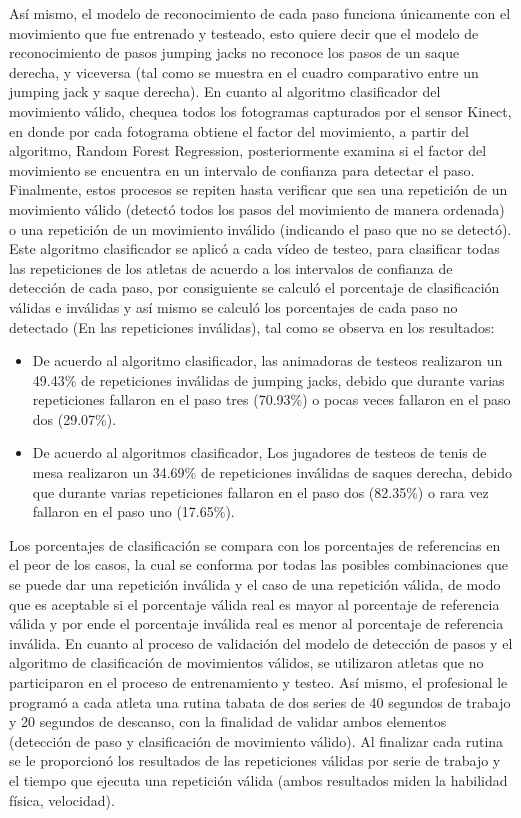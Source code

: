 \medbreak
As\'i mismo, el modelo de reconocimiento de cada paso funciona \'unicamente con el movimiento que fue entrenado y testeado, esto quiere decir que el modelo de reconocimiento de pasos jumping jacks no reconoce los pasos de un saque derecha, y viceversa (tal como se muestra en el cuadro comparativo entre un jumping jack  y saque derecha).
\medbreak
En cuanto al algoritmo clasificador del movimiento v\'alido, chequea todos los fotogramas capturados por el sensor Kinect, en donde por cada fotograma obtiene el factor del movimiento, a partir del algoritmo, Random Forest Regression, posteriormente examina si el factor del movimiento se encuentra en un intervalo de confianza para detectar el paso. Finalmente, estos procesos se repiten hasta verificar que sea una repetici\'on de un movimiento v\'alido (detect\'o todos los pasos del movimiento de manera ordenada) o una repetici\'on de un movimiento inv\'alido (indicando el paso que no se detect\'o).
\medbreak
Este algoritmo clasificador se aplic\'o a cada v\'ideo de testeo, para clasificar todas las repeticiones de los atletas de acuerdo a los intervalos de confianza de detecci\'on de cada paso, por consiguiente se calcul\'o el porcentaje de clasificaci\'on v\'alidas e inv\'alidas y as\'i mismo se calcul\'o los porcentajes de cada paso no detectado (En las repeticiones inv\'alidas), tal como se observa en los resultados:
\begin{itemize}
\item	De acuerdo al algoritmo clasificador, las animadoras de testeos realizaron un 49.43\% de repeticiones inv\'alidas de jumping jacks, debido que durante varias repeticiones fallaron en el paso tres (70.93\%) o pocas veces fallaron en el paso dos (29.07\%).
\item De acuerdo al algoritmos clasificador, Los jugadores de testeos de tenis de mesa realizaron un 34.69\% de repeticiones inv\'alidas de saques derecha, debido que durante varias repeticiones fallaron en el paso dos (82.35\%) o rara vez fallaron en el paso uno (17.65\%).
\end{itemize}
Los porcentajes de clasificaci\'on se compara con los porcentajes de referencias en el peor de los casos, la cual se conforma por todas las posibles combinaciones que se puede dar una repetici\'on inv\'alida y el caso de una repetici\'on v\'alida, de modo que es aceptable si el porcentaje v\'alida real es mayor al porcentaje de referencia v\'alida y por ende el porcentaje inv\'alida real es menor al porcentaje de referencia inv\'alida.
\medbreak
En cuanto al proceso de validaci\'on del modelo de detecci\'on de pasos y el algoritmo de clasificaci\'on de movimientos v\'alidos, se utilizaron atletas que no participaron en el proceso de entrenamiento y testeo. As\'i mismo, el profesional le program\'o a cada atleta una rutina tabata de dos series de 40 segundos de trabajo y 20 segundos de descanso, con la finalidad de validar ambos elementos (detecci\'on de paso y clasificaci\'on de movimiento v\'alido). Al finalizar cada rutina se le proporcion\'o los resultados de las repeticiones v\'alidas por serie de trabajo y el tiempo que ejecuta una repetici\'on v\'alida (ambos resultados miden la habilidad f\'isica, velocidad). 
